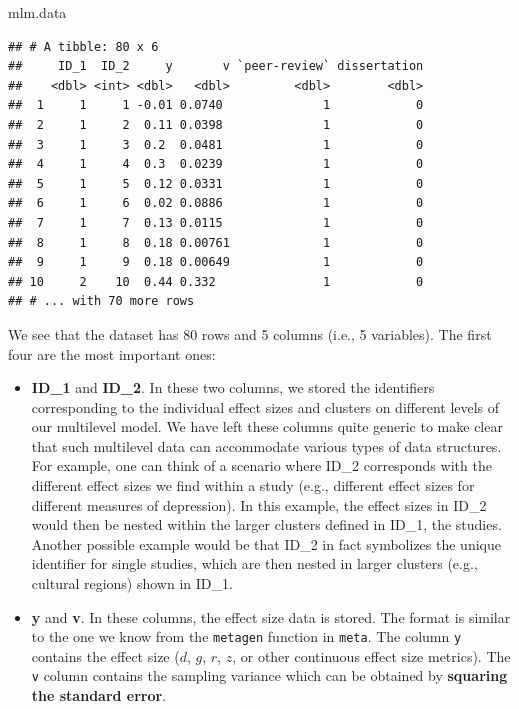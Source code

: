 \documentclass[]{book}
\newenvironment{Shaded}{\begin{snugshade}}{\end{snugshade}}
\newcommand{\NormalTok}[1]{#1}
\providecommand{\tightlist}{%
  \setlength{\itemsep}{0pt}\setlength{\parskip}{0pt}}
\begin{document}
\begin{Shaded}
\begin{Highlighting}[]
\NormalTok{mlm.data}
\end{Highlighting}
\end{Shaded}

\begin{verbatim}
## # A tibble: 80 x 6
##     ID_1  ID_2     y       v `peer-review` dissertation
##    <dbl> <int> <dbl>   <dbl>         <dbl>        <dbl>
##  1     1     1 -0.01 0.0740              1            0
##  2     1     2  0.11 0.0398              1            0
##  3     1     3  0.2  0.0481              1            0
##  4     1     4  0.3  0.0239              1            0
##  5     1     5  0.12 0.0331              1            0
##  6     1     6  0.02 0.0886              1            0
##  7     1     7  0.13 0.0115              1            0
##  8     1     8  0.18 0.00761             1            0
##  9     1     9  0.18 0.00649             1            0
## 10     2    10  0.44 0.332               1            0
## # ... with 70 more rows
\end{verbatim}

We see that the dataset has 80 rows and 5 columns (i.e., 5 variables). The first four are the most important ones:

\begin{itemize}
\tightlist
\item
  \textbf{ID\_1} and \textbf{ID\_2}. In these two columns, we stored the identifiers corresponding to the individual effect sizes and clusters on different levels of our multilevel model. We have left these columns quite generic to make clear that such multilevel data can accommodate various types of data structures. For example, one can think of a scenario where ID\_2 corresponds with the different effect sizes we find within a study (e.g., different effect sizes for different measures of depression). In this example, the effect sizes in ID\_2 would then be nested within the larger clusters defined in ID\_1, the studies. Another possible example would be that ID\_2 in fact symbolizes the unique identifier for single studies, which are then nested in larger clusters (e.g., cultural regions) shown in ID\_1.
\item
  \textbf{y} and \textbf{v}. In these columns, the effect size data is stored. The format is similar to the one we know from the \texttt{metagen} function in \texttt{meta}. The column \texttt{y} contains the effect size (\(d\), \(g\), \(r\), \(z\), or other continuous effect size metrics). The \texttt{v} column contains the sampling variance which can be obtained by \textbf{squaring the standard error}.
\end{itemize}
\end{document}
